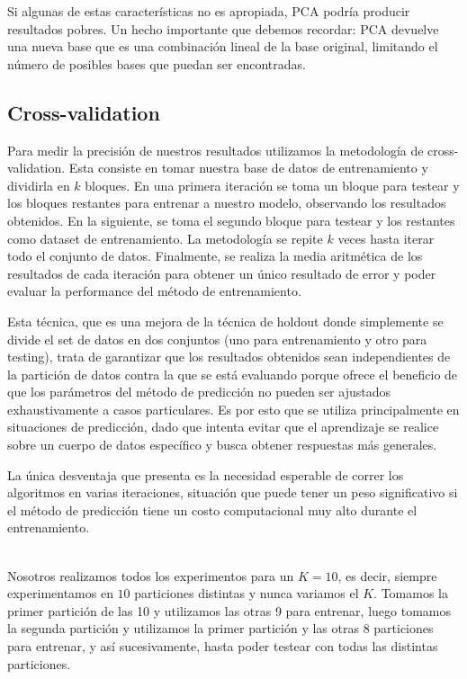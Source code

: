 Si algunas de estas características no es apropiada, PCA podría producir resultados pobres.
Un hecho importante que debemos recordar: PCA devuelve una nueva base que es una combinación lineal de la base original, limitando el número de posibles bases que puedan ser encontradas.

\subsection{Cross-validation}
Para medir la precisión de nuestros resultados utilizamos la metodología de cross-validation. Esta consiste en tomar nuestra base de datos de entrenamiento y dividirla en $k$ bloques. En una primera iteración se toma un bloque para testear y los bloques restantes para entrenar a nuestro modelo, observando los resultados obtenidos. En la siguiente, se toma el segundo bloque para testear y los restantes como dataset de entrenamiento. La metodología se repite $k$ veces hasta iterar todo el conjunto de datos. Finalmente, se realiza la media aritmética de los resultados de cada iteración para obtener un único resultado de error y poder evaluar la performance del método de entrenamiento.


Esta técnica, que es una mejora de la técnica de holdout donde simplemente se divide el set de datos en dos conjuntos (uno para entrenamiento y otro para testing), trata de garantizar que los resultados obtenidos sean independientes de la partición de datos contra la que se está evaluando porque ofrece el beneficio de que los parámetros del método de predicción no pueden ser ajustados exhaustivamente a casos particulares. Es por esto que se utiliza principalmente en situaciones de predicción, dado que intenta evitar que el aprendizaje se realice sobre un cuerpo de datos específico y busca obtener respuestas más generales.

La única desventaja que presenta es la necesidad esperable de correr los algoritmos en varias iteraciones, situación que puede tener un peso significativo si el método de predicción tiene un costo computacional muy alto durante el entrenamiento. 

\\
Nosotros realizamos todos los experimentos para un $K=10$, es decir, siempre experimentamos en $10$ particiones distintas y nunca variamos el $K$. Tomamos la primer partición de las 10 y utilizamos las otras 9 para entrenar, luego tomamos la segunda partición y utilizamos la primer partición y las otras $8$ particiones para entrenar, y así sucesivamente, hasta poder testear con todas las distintas particiones.

